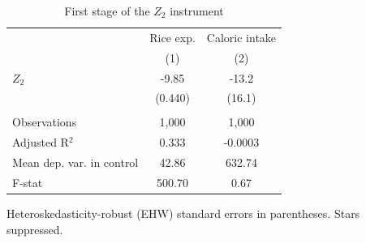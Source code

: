 
\begin{table}[htbp]
   \caption{\label{tab:fs_z2} First stage of the $Z_2$ instrument}
   \bigskip
   \centering
   \begin{tabular}{lcc}
      \toprule
                                & Rice exp. & Caloric intake \\   
                                & (1)       & (2)\\  
      \midrule 
      $Z_2$                     & -9.85     & -13.2\\   
                                & (0.440)   & (16.1)\\   
       \\
      Observations              & 1,000     & 1,000\\  
      Adjusted R$^2$            & 0.333     & -0.0003\\  
      Mean dep. var. in control & 42.86     & 632.74\\  
      F-stat                    & 500.70    & 0.67\\  
      \bottomrule
   \end{tabular}
   
   \par \raggedright 
   Heteroskedasticity-robust (EHW) standard errors in parentheses. Stars suppressed.
\end{table}


